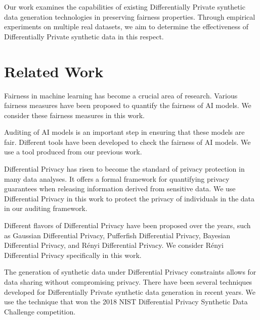 \documentclass[manuscript,screen,review,anonymous]{acmart}
\begin{document}

Our work examines the capabilities of existing Differentially Private synthetic data generation technologies in preserving fairness properties. Through empirical experiments on multiple real datasets, we aim to determine the effectiveness of Differentially Private synthetic data in this respect.

\section{Related Work}


Fairness in machine learning has become a crucial area of research\cite{barocas2023fairness}. Various fairness measures have been proposed to quantify\cite{yeh2024analyzing} the fairness of AI models\cite{pessach2022review,corbett2017algorithmic,vzliobaite2017measuring,hardt2016equality,corbett2017algorithmic,berk2021fairness,chouldechova2017fair,kleinberg2016inherent}. We consider these fairness measures in this work.

Auditing of AI models is an important step in ensuring that these models are fair\cite{ferrara2023fairness}. Different tools have been developed to check the fairness of AI models\cite{saleiro2018aequitas,bellamy2019ai,bird2020fairlearn}. We use a tool produced from our previous work\cite{yuan2024ensuring}.


Differential Privacy has risen to become the standard of privacy protection in many data analyses\cite{jiang2021applications}. It offers a formal framework for quantifying privacy guarantees when releasing information derived from sensitive data\cite{dwork2006calibrating,dwork2014algorithmic}. We use Differential Privacy in this work to protect the privacy of individuals in the data in our auditing framework.

Different flavors of Differential Privacy have been proposed over the years\cite{desfontaines2019sok}, such as Gaussian Differential Privacy\cite{dong2022gaussian}, Pufferfish Differential Privacy\cite{kifer2012rigorous}, Bayesian Differential Privacy\cite{triastcyn2020bayesian}, and R\'enyi Differential Privacy\cite{mironov2017renyi}. We consider R\'enyi Differential Privacy specifically in this work.


The generation of synthetic data\cite{raghunathan2021synthetic,lu2023machine} under Differential Privacy constraints allows for data sharing without compromising privacy\cite{tao2021benchmarking}. There have been several techniques developed for Differentially Private synthetic data generation\cite{rosenblatt2020differentially,fan2020relational,bowen2019comparative,bowen2020comparative,arnold2020really,xu2019modeling} in recent years. We use the technique that won the 2018 NIST Differential Privacy Synthetic Data Challenge competition\cite{mckenna2021winning}.
\end{document}
